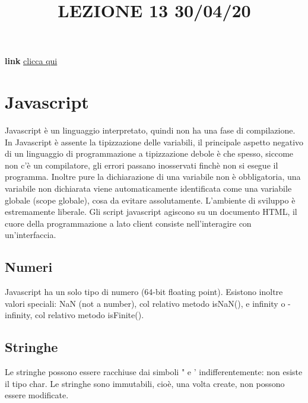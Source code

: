 \title{LEZIONE 13 30/04/20}
\textbf{link} \href{https://web.microsoftstream.com/video/9d3a5028-1a7e-471e-95cd-1bcf6ae58d8a?list=user&userId=cfe0965d-9a7c-40e2-be6e-f078296a1914}{clicca qui}
\section{Javascript}
Javascript è un linguaggio interpretato, quindi non ha una fase di compilazione.\newline
\newline
In Javascript è assente la tipizzazione delle variabili, il principale aspetto negativo di un linguaggio di programmazione a tipizzazione debole è che spesso, siccome non c'è un compilatore, gli errori passano inosservati finchè non si esegue il programma.\newline
Inoltre pure la dichiarazione di una variabile non è obbligatoria, una variabile non dichiarata viene automaticamente identificata come una variabile globale (scope globale), cosa da evitare assolutamente.\newline
L'ambiente di sviluppo è estremamente liberale.\newline
\newline
Gli script javascript agiscono su un documento HTML, il cuore della programmazione a lato client consiste nell'interagire con un'interfaccia.
\subsection{Numeri}
Javascript ha un solo tipo di numero (64-bit floating point).\newline
\newline
Esistono inoltre valori speciali: NaN (not a number), col relativo metodo isNaN(), e infinity o -infinity, col relativo metodo isFinite().
\subsection{Stringhe}
Le stringhe possono essere racchiuse dai simboli " e ' indifferentemente: non esiste il tipo char.\newline
\newline
Le stringhe sono immutabili, cioè, una volta create, non possono essere modificate.

